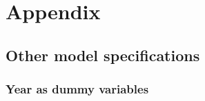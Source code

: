 \documentclass[12pt,]{article}
\begin{document}
\clearpage

\hypertarget{appendix}{%
\section{Appendix}\label{appendix}}

\hypertarget{other-model-specifications}{%
\subsection{Other model
specifications}\label{other-model-specifications}}

\hypertarget{year-as-dummy-variables}{%
\subsubsection{Year as dummy variables}\label{year-as-dummy-variables}}
\end{document}
